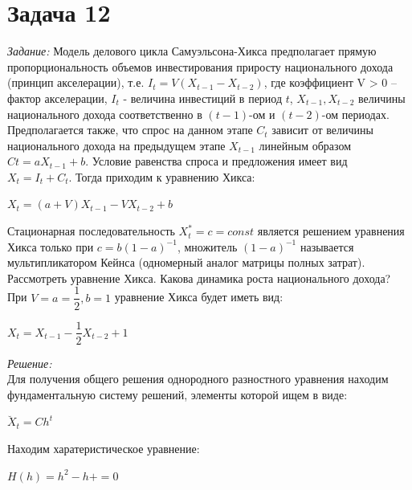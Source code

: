 \documentclass[14pt,fleqn]{extarticle}
\begin{document}
	\section*{Задача 12}
	\textit{Задание:} Модель делового цикла Самуэльсона-Хикса предполагает прямую
	пропорциональность объемов инвестирования приросту национального
	дохода (принцип акселерации), т.е. $I_t = V(X_{t-1} - X_{t-2})$, где коэффициент $\mbox{V > 0}$ -- фактор акселерации, $I_t$ - величина инвестиций в период $t$, $X_{t-1}, X_{t-2}$ величины
	национального дохода соответственно в $(t-1)$-ом и $(t-2)$-ом периодах.
	Предполагается также, что спрос на данном этапе $C_t$ зависит от величины
	национального дохода на предыдущем этапе $X_{t-1}$ линейным образом $Ct = aX_{t-1} + b$. Условие равенства спроса и предложения имеет вид $X_t = I_t + C_t$. Тогда
	приходим к уравнению Хикса:
	\begin{center}
		$X_t = (a+V)X_{t-1} - VX_{t-2} + b$
	\end{center}
	Стационарная последовательность $X_t^* = c = const$ является решением
	уравнения Хикса только при $c = b(1-a)^{-1}$, множитель $(1 - a)^{-1}$ называется
	мультипликатором Кейнса (одномерный аналог матрицы полных затрат).\\
	Рассмотреть уравнение Хикса. Какова динамика роста национального
	дохода?\\
	При $V = a = \dfrac{1}{2}, b = 1$ уравнение Хикса будет иметь вид:\\
	\begin{center}
		$X_t = X_{t-1} - \dfrac{1}{2}X_{t-2} + 1$
	\end{center}
	\textit{Решение:}\\
	Для получения общего решения однородного разностного уравнения находим фундаментальную систему решений, элементы которой ищем в виде:
	\begin{center}
		$\breve{X}_t = Ch^t$
	\end{center}
	Находим харатеристическое уравнение:
	\begin{center}
		$H(h) = h^2 - h +  = 0$
	\end{center}
\end{document}
